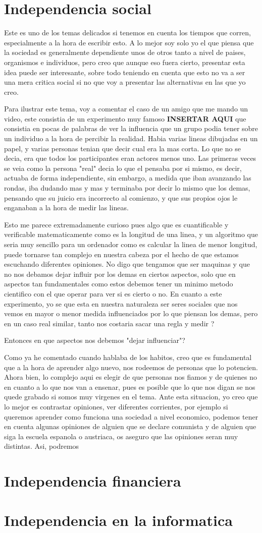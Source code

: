 \section{Independencia social}
Este es uno de los temas delicados si tenemos en cuenta los tiempos que corren, especialmente a la hora de escribir esto. A lo mejor soy solo yo el que piensa que la sociedad es generalmente dependiente unos de otros tanto a nivel de paises, organismos e individuos, pero creo que aunque eso fuera cierto, presentar esta idea puede ser interesante, sobre todo teniendo en cuenta que esto no va a ser una mera critica social si no que voy a presentar las alternativas en las que yo creo.

Para ilustrar este tema, voy a comentar el caso de un amigo que me mando un video, este consistia de un experimento muy famoso \textbf{INSERTAR AQUI} que consistia en pocas de palabras de ver la influencia que un grupo podia tener sobre un individuo a la hora de percibir la realidad. Habia varias lineas dibujadas en un papel, y varias personas tenian que decir cual era la mas corta. Lo que no se decia, era que todos los participantes eran actores menos uno. Las primeras veces se veia como la persona "real" decia lo que el pensaba por si mismo, es decir, actuaba de forma independiente, sin embargo, a medida que iban avanzando las rondas, iba dudando mas y mas y terminaba por decir lo mismo que los demas, pensando que su juicio era incorrecto al comienzo, y que sus propios ojos le enganaban a la hora de medir las lineas.

Esto me parece extremadamente curioso pues algo que es cuantificable y verificable matematicamente como es la longitud de una linea, y un algoritmo que seria muy sencillo para un ordenador como es calcular la linea de menor longitud, puede tornarse tan complejo en nuestra cabeza por el hecho de que estamos escuchando diferentes opiniones. No digo que tengamos que ser maquinas y que no nos debamos dejar influir por los demas en ciertos aspectos, solo que en aspectos tan fundamentales como estos debemos tener un minimo metodo cientifico con el que operar para ver si es cierto o no. En cuanto a este experimento, yo se que esta en nuestra naturaleza ser seres sociales que nos vemos en mayor o menor medida influenciados por lo que piensan los demas, pero en un caso real similar, tanto nos costaria sacar una regla y medir ? 

Entonces en que aspectos nos debemos "dejar influenciar"? 

Como ya he comentado cuando hablaba de los habitos, creo que es fundamental que a la hora de aprender algo nuevo, nos rodeemos de personas que lo potencien. Ahora bien, lo complejo aqui es elegir de que personas nos fiamos y de quienes no en cuanto a lo que nos van a ensenar, pues es posible que lo que nos digan se nos quede grabado si somos muy virgenes en el tema. Ante esta situacion, yo creo que lo mejor es contrastar opiniones, ver diferentes corrientes, por ejemplo si queremos aprender como funciona una sociedad a nivel economico, podemos tener en cuenta algunas opiniones de alguien que se declare comunista y de alguien que siga la escuela espanola o austriaca, os aseguro que las opiniones seran muy distintas. Asi, podremos 
\section{Independencia financiera}
\section{Independencia en la informatica}
